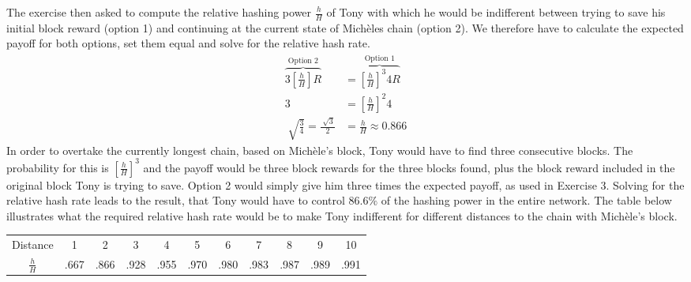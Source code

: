 \documentclass[12pt]{article}
\begin{document}
	The exercise then asked to compute the relative hashing power $\frac{h}{H}$ of Tony with which he would be indifferent between trying to save his initial block reward (option 1) and continuing at the current state of Michèles chain (option 2). We therefore have to calculate the expected payoff for both options, set them equal and solve for the relative hash rate.
	\begin{align*}
		\overbrace{3\left[\frac{h}{H}\right]R}^{\text{Option 2}}&=\overbrace{\left[\frac{h}{H}\right]^3 4R}^{\text{Option 1}}\\
		3&= \left[\frac{h}{H}\right]^2 4\\
		\sqrt[]{\frac{3}{4}}=\frac{\sqrt[]{3}}{2}&=\frac{h}{H}\approx 0.866
	\end{align*}
	In order to overtake the currently longest chain, based on Michèle's block, Tony would have to find three consecutive blocks. The probability for this is $\left[\frac{h}{H}\right]^3$ and the payoff would be three block rewards for the three blocks found, plus the block reward included in the original block Tony is trying to save. Option 2 would simply give him three times the expected payoff, as used in Exercise 3. Solving for the relative hash rate leads to the result, that Tony would have to control $86.6\%$ of the hashing power in the entire network. The table below illustrates what the required relative hash rate would be to make Tony indifferent for different distances to the chain with Michèle's block.
	\begin{table}[h!]
		\centering
		\resizebox{11cm}{!} {
			\begin{tabular}{c c c c c c c c c c c}
				\hline \hline Distance & 1 & 2 & 3 & 4 & 5 & 6 & 7 & 8 & 9 & 10 \\
				$\frac{h}{H}$ & .667 & .866 & .928 & .955 & .970 & .980 & .983 & .987 & .989 & .991\\
				\hline \hline
			\end{tabular}
		}
	\end{table}
	
\end{document}
